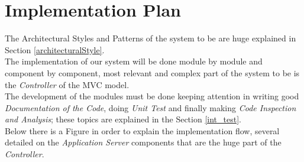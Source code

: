 \section{Implementation Plan}
The Architectural Styles and Patterns of the system to be are huge explained in Section \ref{architecturalStyle}.\\
The implementation of our system will be done module by module and component by component, most relevant and complex part of the system to be is the \textit{Controller} of the MVC model.\\
The development of the modules must be done keeping attention in writing good \textit{Documentation of the Code}, doing \textit{Unit Test} and
finally making \textit{Code Inspection and Analysis}; these topics are explained in the Section \ref{int_test}.\\
Below there is a Figure in order to explain the implementation flow, several detailed on the \textit{Application Server} components that are the huge part of the \textit{Controller}.

